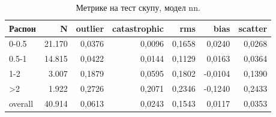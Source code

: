 \begin{table}[htbp]
\centering
\caption{Метрике на тест скупу, модел nn.}
\label{tab:metrics-nn}
\begin{tabular}{lrrrrrr}
\toprule
Распон & N & outlier & catastrophic & rms & bias & scatter \\
\midrule
0-0.5 & 21.170 & 0,0376 & 0,0096 & 0,1658 & 0,0240 & 0,0268 \\
0.5-1 & 14.815 & 0,0422 & 0,0144 & 0,1129 & 0,0163 & 0,0364 \\
1-2 & 3.007 & 0,1879 & 0,0595 & 0,1802 & -0,0104 & 0,1390 \\
>2 & 1.922 & 0,2726 & 0,2071 & 0,2346 & -0,1240 & 0,2433 \\
overall & 40.914 & 0,0613 & 0,0243 & 0,1543 & 0,0117 & 0,0353 \\
\bottomrule
\end{tabular}
\end{table}
